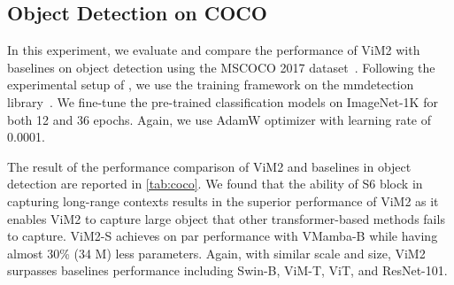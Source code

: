 \documentclass{article}
\newcommand{\head}[1]{\vspace{1.7mm}\noindent{{\textcolor{c1}{\bf #1.}}}}
\begin{document}
\subsection{Object Detection on COCO}
\head{Setup}
In this experiment, we evaluate and compare the performance of ViM2 with baselines on object detection using the MSCOCO 2017 dataset~\citep{lin2014microsoft}. Following the experimental setup of \citet{liu2024vmamba}, we use the training framework on the mmdetection library~\citep{chen2019mmdetection}. We fine-tune the pre-trained classification models on ImageNet-1K for both 12 and 36 epochs. Again, we use AdamW optimizer with learning rate of 0.0001. 


\head{Results}
The result of the performance comparison of ViM2 and baselines in object detection are reported in \autoref{tab:coco}. We found that the ability of S6 block in capturing long-range contexts results in the superior performance of ViM2 as it enables ViM2 to capture large object that other transformer-based methods fails to capture. ViM2-S achieves on par performance with VMamba-B while having almost 30\% (34 M) less parameters. Again, with similar scale and size, ViM2 surpasses baselines performance including Swin-B, ViM-T, ViT, and ResNet-101. 
\end{document}
